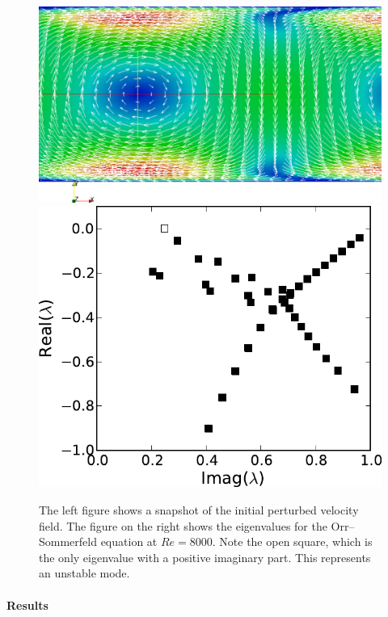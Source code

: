 \begin{figure}
\bwfig
  \centering
  \includegraphics[width=\twofigs]{chapters/mortensen/pdf/OS_init.pdf}
  \includegraphics[width=\twofigs]{chapters/mortensen/pdf/OrrS_eigvals.pdf}
  \caption{The left figure shows a snapshot of the initial perturbed velocity
    field. The figure on the right shows the eigenvalues for the Orr--Sommerfeld equation
    at $Re=8000$. Note the open square, which is the only eigenvalue
    with a positive imaginary part. This represents an unstable mode.}
  \label{fig:mortensen:OS_init}
\end{figure}

\paragraph{Results}


